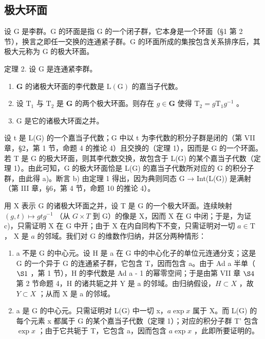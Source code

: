 \subsection{极大环面}

设 G 是李群。G 的环面是指 G 的一个闭子群，它本身是一个环面（§1 第 2 节），换言之即任一交换的连通紧子群。G 的环面所成的集按包含关系排序后，其极大元称为 G 的极大环面。

定理 2. 设 G 是连通紧李群。

\begin{enumerate}
\def\labelenumi{\alph{enumi})}
\item
  \(\mathbf{G}\) 的诸极大环面的李代数是 \(\mathrm{L}(\mathrm{G})\) 的嘉当子代数。
\item
  设 \(\mathrm{T}_1\) 与 \(\mathrm{T}_2\) 是 \(\mathbf{G}\) 的两个极大环面。则存在 \(g \in \mathbf{G}\) 使得 \(\mathrm{T}_2 = g\mathrm{T}_1g^{-1}\) 。
\item
  G 是它的诸极大环面之并。
\end{enumerate}

设 t 是 L(G) 的一个嘉当子代数；G 中以 t 为李代数的积分子群是闭的（第 VII 章，§2，第 1 节，命题 4 的推论 4）且交换的（定理 1），因而是 G 的一个环面。若 T 是 G 的极大环面，则其李代数交换，故包含于 L(G) 的某个嘉当子代数（定理 1）。由此可知，G 的极大环面恰是 L(G) 的嘉当子代数所对应的 G 的积分子群，由此得 a)。断言 b) 由定理 1 得出，因为典则同态 G → Int(L(G)) 是满射（第 III 章，§6，第 4 节，命题 10 的推论 4）。

用 X 表示 G 的诸极大环面之并，设 T 是 G 的一个极大环面。连续映射 \((g,t)\mapsto gtg^{-1}\) （从 \(G\times T\) 到 G）的像是 X，因而 X 在 G 中闭；于是，为证 c)，只需证明 X 在 G 中开；由于 X 在内自同构下不变，只需证明对一切 \(a \in \mathrm{T}\) ， \(\mathrm{X}\) 是 \(a\) 的邻域。我们对 \(\mathrm{G}\) 的维数作归纳，并区分两种情形：

\begin{enumerate}
\def\labelenumi{\arabic{enumi})}
\item
  a 不是 G 的中心元。设 H 是 a 在 G 中的中心化子的单位元连通分支；这是 G 的一个异于 G 的连通紧子群，它包含 T，因而包含 a。由于 Ad a 半单（ \(\S1\) ，第 1 节），H 的李代数是 Ad a - 1 的幂零空间；于是由第 VII 章 \(\S4\) 第 2 节命题 4，H 的诸共轭之并 Y 是 a 的邻域。由归纳假设，\(H \subset X\) ，故 \(Y \subset X\) ；从而 X 是 a 的邻域。
\item
  a 是 G 的中心元。只需证明对 L(G) 中一切 x，\(a \exp x\) 属于 X。而 L(G) 的每个元素 x 都属于 G 的某个嘉当子代数（定理 1）；对应的积分子群 T' 包含 \(\exp x\) ；由于它共轭于 T，它包含 a，因而包含 \(a \exp x\) ，此即所要证明的。
\end{enumerate}

